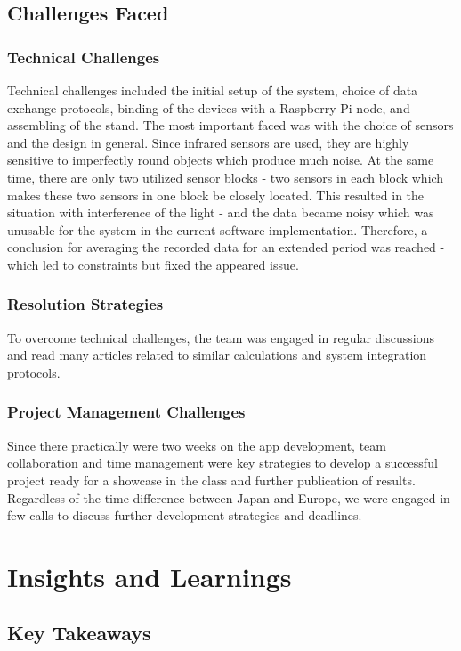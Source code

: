 \documentclass[12pt,a4paper]{article}
\begin{document}
\subsection{Challenges Faced}
\subsubsection{Technical Challenges}
Technical challenges included the initial setup of the system, choice of data exchange protocols, binding of the devices with a Raspberry Pi node, and assembling of the stand. The most important faced was with the choice of sensors and the design in general. Since infrared sensors are used, they are highly sensitive to imperfectly round objects which produce much noise. At the same time, there are only two utilized sensor blocks - two sensors in each block which makes these two sensors in one block be closely located. This resulted in the situation with interference of the light - and the data became noisy which was unusable for the system in the current software implementation. Therefore, a conclusion for averaging the recorded data for an extended period was reached - which led to constraints but fixed the appeared issue.

\subsubsection{Resolution Strategies}
To overcome technical challenges, the team was engaged in regular discussions and read many articles related to similar calculations and system integration protocols.

\subsubsection{Project Management Challenges}
Since there practically were two weeks on the app development, team collaboration and time management were key strategies to develop a successful project ready for a showcase in the class and further publication of results. Regardless of the time difference between Japan and Europe, we were engaged in few calls to discuss further development strategies and deadlines.

\section{Insights and Learnings}
\subsection{Key Takeaways}
\end{document}
